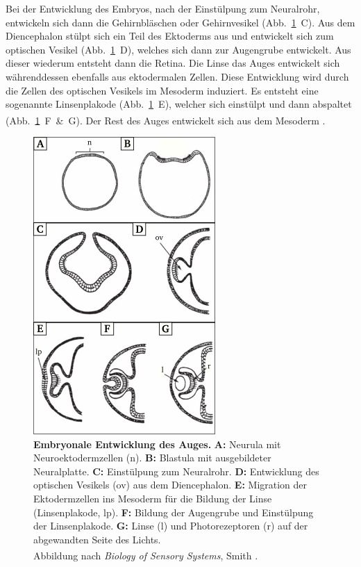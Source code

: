 \documentclass[12pt,a4paper,pdftex]{article}
\begin{document}
Bei der Entwicklung des Embryos, nach der Einstülpung zum Neuralrohr, entwickeln sich dann die Gehirnbläschen oder Gehirnvesikel (Abb.~\ref{fig:eye_neurulation}~C). Aus dem Diencephalon stülpt sich ein Teil des Ektoderms aus und entwickelt sich zum optischen Vesikel (Abb.~\ref{fig:eye_neurulation}~D), welches sich dann zur Augengrube  entwickelt. Aus dieser wiederum entsteht dann die Retina. Die Linse das Auges entwickelt sich währenddessen ebenfalls aus ektodermalen Zellen. Diese Entwicklung wird durch die Zellen des optischen Vesikels  im Mesoderm induziert. Es entsteht eine sogenannte Linsenplakode  (Abb.~\ref{fig:eye_neurulation}~E), welcher sich einstülpt und dann abspaltet (Abb.~\ref{fig:eye_neurulation}~F~\&~G). Der Rest des Auges entwickelt sich aus dem Mesoderm \textsuperscript{\cite[16]{smith2008biology}}.

\begin{figure}[H]
    \centering
    \includegraphics{pictures/visual/Eye_Neurulation.png}
    \caption[Embryonale Entwicklung des Auges]{\textbf{Embryonale Entwicklung des Auges.} \textbf{A:} Neurula mit Neuroektodermzellen (n). \textbf{B:} Blastula mit ausgebildeter Neuralplatte. \textbf{C:} Einstülpung zum Neuralrohr. \textbf{D:} Entwicklung des optischen Vesikels (ov) aus dem Diencephalon. \textbf{E:} Migration der Ektodermzellen ins Mesoderm für die Bildung der Linse (Linsenplakode, lp). \textbf{F:} Bildung der Augengrube und Einstülpung der Linsenplakode. \textbf{G:} Linse (l) und Photorezeptoren (r) auf der abgewandten Seite des Lichts.\\
    Abbildung nach \textit{Biology of Sensory Systems}, Smith \textsuperscript{\cite[16]{smith2008biology}}.}
    \label{fig:eye_neurulation}
\end{figure}
\end{document}
